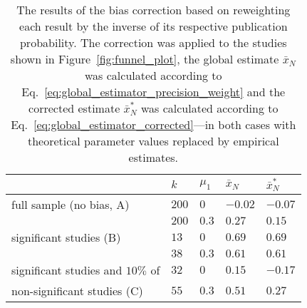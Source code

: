\begin{table}[h!]
  \begin{center}
    \begin{tabular}{ >{\raggedright\let\\\tabularnewline}p{} | >{\raggedleft\let\\\tabularnewline}p{}| >{\raggedleft\let\\\tabularnewline}p{} | >{\raggedleft\let\\\tabularnewline}p{} | >{\raggedleft\let\\\tabularnewline}p{}} 
        \hline
         & $k$\TBstrut & $\mu_1$ & $\bar{x}_N$ & $\bar{x}_N^{*}$ \\ 
        \hline
        full sample (no bias, A)\Tstrut & $200$ & $0$ & $-0.02$  & $-0.07$ \\ 
        & $200$\Bstrut & $0.3$ & $0.27$  & $0.15$\\
        \hline
        significant studies (B)\Tstrut& $13$ & $0$ & $0.69$ & $0.69$ \\
        & $38$\Bstrut & $0.3$ & $0.61$ & $0.61$ \\
        \hline
        significant studies and $10\%$ of\Tstrut & $32$ & $0$ & $0.15$ & $-0.17$ \\
        non-significant studies (C) & $55$\Bstrut & $0.3$ & $0.51$ & $0.27$ \\
     \hline
    \end{tabular}
    \caption[Bias correction by reweighting with publication probabilities.]{The results of the bias correction based on reweighting each result by the inverse of its respective publication probability. The correction was applied to the studies shown in Figure~\ref{fig:funnel_plot}, the global estimate $\bar{x}_N$ was calculated according to Eq.~\ref{eq:global_estimator_precision_weight} and the corrected estimate $\bar{x}_N^{*}$ was calculated according to Eq.~\ref{eq:global_estimator_corrected}---in both cases with theoretical parameter values replaced by empirical estimates.}
    \label{tab:hansen_hurvitz}
  \end{center}
\end{table}

